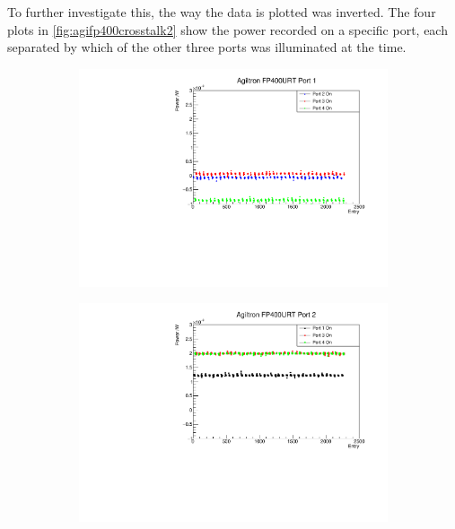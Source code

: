 \documentclass[a4paper,11pt]{article}
\begin{document}
To further investigate this, the way the data is plotted was inverted. The four plots in \cref{fig:agifp400crosstalk2} show the power recorded on a specific port, each separated by which of the other three ports was illuminated at the time.
\begin{figure}[h!]
\centering
\begin{subfigure}{0.5\textwidth}
\includegraphics[width=\linewidth]{AgiltronFP400URTPort1.pdf}
\subcaption{}\label{fig:agifp400crosstalkport1}
\end{subfigure}%
\begin{subfigure}{0.5\textwidth}
\includegraphics[width=\linewidth]{AgiltronFP400URTPort2.pdf}
\subcaption{}\label{fig:agifp400crosstalkport2}
\end{subfigure}
\\
\begin{subfigure}{0.5\textwidth}

\end{subfigure}
\end{figure}
\end{document}
